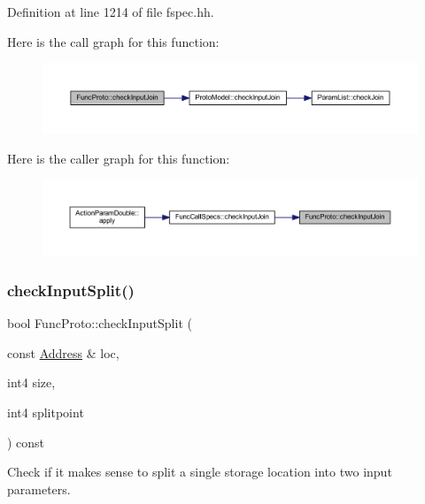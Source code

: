 Definition at line 1214 of file fspec.\+hh.

Here is the call graph for this function\+:
\nopagebreak
\begin{figure}[H]
\begin{center}
\leavevmode
\includegraphics[width=350pt]{class_func_proto_a961837591bf1445a8db9d7604c1e5046_cgraph}
\end{center}
\end{figure}
Here is the caller graph for this function\+:
\nopagebreak
\begin{figure}[H]
\begin{center}
\leavevmode
\includegraphics[width=350pt]{class_func_proto_a961837591bf1445a8db9d7604c1e5046_icgraph}
\end{center}
\end{figure}
\mbox{\label{class_func_proto_a768d557c966fc2f59c8ae0f09777b4fe}} 
\subsubsection{\texorpdfstring{checkInputSplit()}{checkInputSplit()}}
{\footnotesize\ttfamily bool Func\+Proto\+::check\+Input\+Split (\begin{DoxyParamCaption}\item[{const \mbox{\hyperlink{class_address}{Address}} \&}]{loc,  }\item[{int4}]{size,  }\item[{int4}]{splitpoint }\end{DoxyParamCaption}) const\hspace{0.3cm}{\ttfamily [inline]}}



Check if it makes sense to split a single storage location into two input parameters. 


